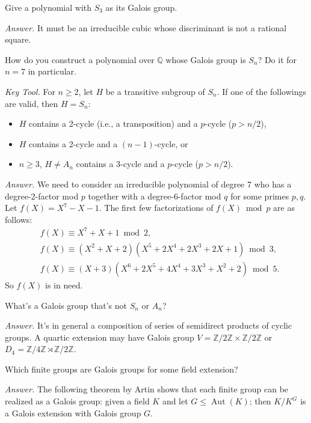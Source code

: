 \documentclass{mathproblems}
\newcommand\Q{\mathbb{Q}}
\newcommand\Z{\mathbb{Z}}
\DeclareMathOperator{\Aut}{Aut}
\begin{document}
\begin{questions}
\miquestion
{\color{blue} Give a polynomial with $S_{3}$ as its Galois group.}

\textit{Answer.}
It must be an irreducible cubic whose discriminant is not a rational square.

\miquestion
{\color{blue} How do you construct a polynomial over $\Q$ whose Galois group is $S_{n}$? Do it for $n=7$ in particular.}

{\color{violet}
\textit{Key Tool.} For $n\geq 2$, let $H$ be a transitive subgroup of $S_n$. If one of the followings are valid, then $H=S_n$: \vspace{-4pt}
\begin{itemize}
    \item $H$ contains a 2-cycle (i.e., a transposition) and a $p$-cycle ($p>n/2$),
    \item $H$ contains a 2-cycle and a $(n-1)$-cycle, or
    \item $n\geq 3$, $H\neq A_n$ contains a 3-cycle and a $p$-cycle ($p>n/2$).
\end{itemize} \vspace{-4pt}
}

\textit{Answer.} We need to consider an irreducible polynomial of degree 7 who has a degree-2-factor mod $p$ together with a degree-6-factor mod $q$ for some primes $p,q$. Let $f(X)=X^{7}-X-1$. The first few factorizations of $f(X) \bmod p$ are as follows:
$$
\begin{aligned}
&f(X) \equiv X^{7}+X+1 \bmod 2, \\
&f(X) \equiv(X^{2}+X+2)(X^{5}+2 X^{4}+2 X^{3}+2 X+1) \bmod 3, \\
&f(X) \equiv(X+3)(X^{6}+2 X^{5}+4 X^{4}+3 X^{3}+X^{2}+2) \bmod 5.
\end{aligned}
$$
So $f(X)$ is in need.


\miquestion
{\color{blue} What's a Galois group that's not $S_{n}$ or $A_{n}$?}

\textit{Answer.} It's in general a composition of series of semidirect products of cyclic groups. A quartic extension may have Galois group $V=\Z/2\Z\times \Z/2\Z$ or $D_4= \Z/4\Z\rtimes \Z/2\Z$.

\miquestion
{\color{blue} Which finite groups are Galois groups for some field extension?}

\textit{Answer.} The following theorem by Artin shows that each finite group can be realized as a Galois group: given a field $K$ and let $G\leq \Aut(K)$; then $K/K^G$ is a Galois extension with Galois group $G$.


\end{questions}
\end{document}
